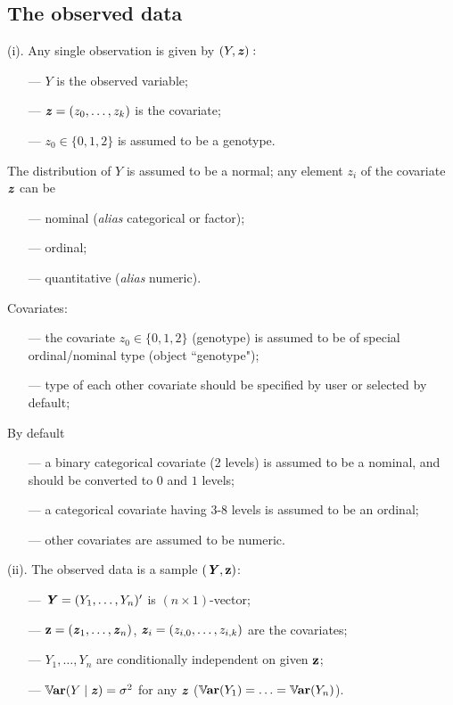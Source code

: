 \documentclass[11pt]{article}
\begin{document}
\subsection*{The observed data}
\noindent (i). Any single observation is given by $(Y,\mbox{\textbf{\textit z}}):$\vspace{-2mm}
\begin{itemize}
\setlength\itemsep{-0.5em}
\item[---]
 $Y$ is the observed variable;
\item[---]
$\mbox{\textbf{\textit z}}=(z_0,\ldots,z_k)$ is  the covariate;
\item[---]
$z_0\in\{0,1,2\}$ is assumed to be a genotype.
\end{itemize} 
The distribution of $Y$ is assumed to be a normal; any element $z_i$ of the covariate $\mbox{\textbf{\textit z}}$ can be\vspace{-2mm}
\begin{itemize}
\setlength\itemsep{-0.5em}
\item[---]
nominal (\textit{alias} categorical or factor);
\item[---]
ordinal;
\item[---]
quantitative (\textit{alias} numeric).
\end{itemize} 
Covariates:\vspace{-3mm}
\begin{itemize}
\setlength\itemsep{-0.5em}
\item[---]
the covariate $z_0\in \{0,1,2\}$ (genotype) is assumed to be of special ordinal/nominal type (object ``genotype");
\item[---]
type of each other covariate should be specified by user or selected by default;
\end{itemize} 
By default\vspace{-3mm}
\begin{itemize}
\setlength\itemsep{-0.5em}
\item[---]
a binary categorical covariate (2 levels) is assumed to be a nominal, and should be converted to $0$ and $1$ levels;
\item[---]
a categorical covariate having 3-8 levels is assumed to be an ordinal;
\item[---]
other covariates are assumed to be numeric.
\end{itemize}
\noindent
(ii). The observed data is a sample $(\mbox{\textbf{\textit Y}},\mbox{\bf z})$:\vspace{-2mm}
\begin{itemize}
\setlength\itemsep{-0.5em}
\item[---]
$\mbox{\textbf{\textit Y}}=(Y_1,\ldots,Y_n)'$ is $(n\times 1)$-vector;
\item[---]
$\mbox{\bf z}=(\mbox{\textbf{\textit z}}_1,\ldots,\mbox{\textbf{\textit z}}_n)$, $\mbox{\textbf{\textit z}}_{i}=(z_{i,0},\ldots,z_{i,k})$  are the covariates;
\item[---]
$Y_1,\ldots,Y_n$ are conditionally independent on given $\mbox{\bf z}$;
\item[---]
${\mathbb V}\hspace{-0.2ex}\mbox{\bf ar}(Y\mid\mbox{\textbf{\textit z}})=\sigma^2$ for any $\mbox{\textbf{\textit z}}$ (${\mathbb V}\hspace{-0.2ex}\mbox{\bf ar}(Y_1)=\ldots ={\mathbb V}\hspace{-0.2ex}\mbox{\bf ar}(Y_n)$).
\end{itemize}
\end{document}
